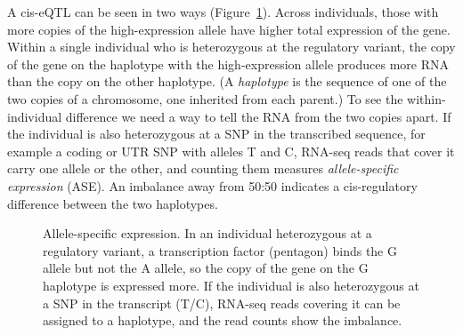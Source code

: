 A cis-eQTL can be seen in two ways (Figure~\ref{fig:ase}). Across individuals, those with more copies of the high-expression allele have higher total expression of the gene. Within a single individual who is heterozygous at the regulatory variant, the copy of the gene on the haplotype with the high-expression allele produces more RNA than the copy on the other haplotype. (A \emph{haplotype} is the sequence of one of the two copies of a chromosome, one inherited from each parent.) To see the within-individual difference we need a way to tell the RNA from the two copies apart. If the individual is also heterozygous at a SNP in the transcribed sequence, for example a coding or UTR SNP with alleles T and C, RNA-seq reads that cover it carry one allele or the other, and counting them measures \emph{allele-specific expression} (ASE). An imbalance away from 50:50 indicates a cis-regulatory difference between the two haplotypes.

\begin{figure}[!htbp]
  \centering
  \caption{Allele-specific expression. In an individual heterozygous at a regulatory variant, a transcription factor (pentagon) binds the G allele but not the A allele, so the copy of the gene on the G haplotype is expressed more. If the individual is also heterozygous at a SNP in the transcript (T/C), RNA-seq reads covering it can be assigned to a haplotype, and the read counts show the imbalance.}
  \label{fig:ase}
\end{figure}

